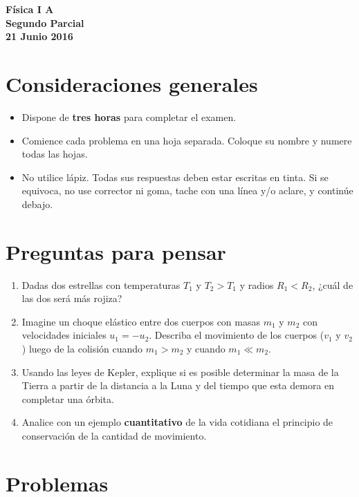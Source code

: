 \documentclass[a4paper,12pt]{article}
\begin{document}
\pagestyle{empty}
\begin{center}
{\Large {\bf{Física I A}}} \\
{\large {\bf{Segundo Parcial}}} \\ {\bf{21 Junio 2016}} \\
\end{center}
\vspace{-2em}
\section{Consideraciones generales}

\begin{itemize}
	\item Dispone de {\bf{tres horas}} para completar el examen.
	\item Comience cada problema en una hoja separada. Coloque su nombre y
		numere todas las hojas.  
	\item No utilice lápiz. Todas sus respuestas deben estar escritas en tinta.
		Si se equivoca, no use corrector ni goma, tache con una línea y/o
		aclare, y continúe debajo.
\end{itemize}

\section{Preguntas para pensar}

\begin{enumerate}
	\item Dadas dos estrellas con temperaturas $T_1$ y $T_2 > T_1$ y radios
		$R_1 < R_2$, ¿cuál de las dos será más rojiza?  
	\item Imagine un choque elástico entre dos cuerpos con masas $m_1$ y $m_2$
		con velocidades iniciales $u_1 = - u_2$. Describa el movimiento de los
		cuerpos ($v_1$ y $v_2$) luego de la colisión cuando $m_1 > m_2$ y
		cuando $m_1 \ll m_2$. 
	\item Usando las leyes de Kepler, explique si es posible determinar la
		masa de la Tierra a partir de la distancia a la Luna y del tiempo que
		esta demora en completar una órbita. 
	\item Analice con un ejemplo {\bf{cuantitativo}} de la vida cotidiana el
		principio de conservación de la cantidad de movimiento.
\end{enumerate}

\section*{Problemas}
\end{document}
